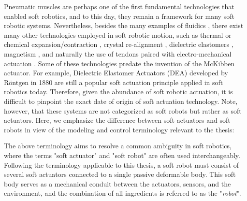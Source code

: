 Pneumatic muscles are perhaps one of the first fundamental technologies that enabled soft robotics, and to this day, they remain a framework for many soft robotic systems. Nevertheless, besides the many examples of fluidics \cite{Marchese2014,Marchese2016,Katzschmann2018,Suzumori1991,Mosadegh2014}, there exist many other technologies employed in soft robotic motion, such as thermal \cite{Wu2021Dec} or chemical expansion/contraction \cite{Tolley2014,Bartlett2015,Wehner2016}, crystal re-alignment \cite{Pilz2020,Lopez2018,Vantomme2021,Polygerinos2013}, dielectric elastomers \cite{Keplinger2011}, magnetism \cite{Roh2019Apr,KimYoonho2018,McDonald2020,Boyvat2017Jul}, and naturally the use of tendons paired with electro-mechanical actuation \cite{Renda2018,Bern2019,Kim2020Jun,Coevoet2017Feb,Wang2016Sep}. Some of these technologies predate the invention of the McKibben actuator. For example, Dielectric Elastomer Actuators (DEA) developed by R\"{o}ntgen in 1880 \cite{Rontgen1880} are still a popular soft actuation principle applied in soft robotics today. Therefore, given the abundance of soft robotic actuation, it is difficult to pinpoint the exact date of origin of soft actuation technology. Note, however, that these systems are not categorized as soft robots but rather as soft actuators. Here, we emphasize the difference between soft actuators and soft robots in view of the modeling and control terminology relevant to the thesis:

%
\begin{rmk} The above terminology aims to resolve a common ambiguity in soft robotics, where the terms "soft actuator" and "soft robot" are often used interchangeably. Following the terminology applicable to this thesis, a soft robot must consist of several soft actuators connected to a single passive deformable body. This soft body serves as a mechanical conduit between the actuators, sensors, and the environment, and the combination of all ingredients is referred to as the "\emph{robot}". 
\end{rmk}

